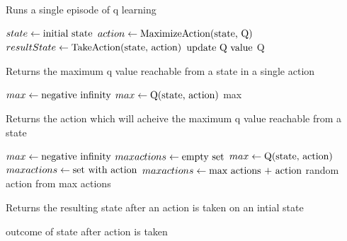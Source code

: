 \documentclass[times, 10pt,twocolumn]{article}
\begin{document}
\begin{algorithm}
  \caption{Runs a single episode of q learning}
  \begin{algorithmic}[3]
      \State $state\gets \textnormal{initial state}$
        \State $action\gets \textnormal{MaximizeAction(state, Q)}$
        \State $resultState\gets \textnormal{TakeAction(state, action)}$
        \State $\textnormal{update Q value}$
      \EndWhile
      \Return Q
    \EndFunction
  \end{algorithmic}
\end{algorithm}

\begin{algorithm}
  \caption{Returns the maximum q value reachable from a state in a single action}
  \begin{algorithmic}[4]
      \State $max\gets \textnormal{negative infinity}$
          \State $max\gets \textnormal{Q(state, action)}$
        \EndIf
      \EndFor
      \Return max
    \EndFunction
  \end{algorithmic}
\end{algorithm}

\begin{algorithm}
  \caption{Returns the action which will acheive the maximum q value reachable from a state}
  \begin{algorithmic}[5]
      \State $max\gets \textnormal{negative infinity}$
      \State $max actions\gets \textnormal{empty set}$
          \State $max\gets \textnormal{Q(state, action)}$
          \State $max actions\gets \textnormal{set with action}$
        \Else
          \State $max actions\gets \textnormal{max actions + action}$
        \EndIf
      \EndFor
      \Return random action from max actions
    \EndFunction
  \end{algorithmic}
\end{algorithm}

\begin{algorithm}
  \caption{Returns the resulting state after an action is taken on an intial state}
  \begin{algorithmic}[6]
      \Return outcome of state after action is taken
    \EndFunction
  \end{algorithmic}
\end{algorithm}





\nocite{ex1,ex2}


\end{document}
